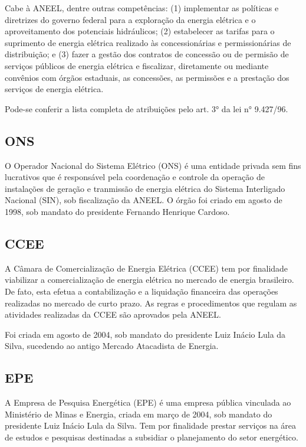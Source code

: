 \documentclass[grad,numbers]{coppe}
\begin{document}
  Cabe à ANEEL, dentre outras competências: (1) implementar as políticas e diretrizes do governo federal para a exploração da energia elétrica e o aproveitamento dos potenciais hidráulicos; (2) estabelecer as tarifas para o suprimento de energia elétrica realizado às concessionárias e permissionárias de distribuição; e (3) fazer a gestão dos contratos de concessão ou de permisão de serviços públicos de energia elétrica e fiscalizar, diretamente ou mediante convênios com órgãos estaduais, as concessões, as permissões e a prestação dos serviços de energia elétrica.
  
  Pode-se conferir a lista completa de atribuições pelo art. 3° da lei n°
  9.427/96.
  
  \hypertarget{ons}{%
  \subsection{ONS}\label{ons}}
  
  O Operador Nacional do Sistema Elétrico (ONS) é uma entidade privada sem fins lucrativos que é responsável pela coordenação e controle da operação de instalações de geração e tranmissão de energia elétrica do Sistema Interligado Nacional (SIN), sob fiscalização da ANEEL. O órgão foi criado em agosto de 1998, sob mandato do presidente Fernando Henrique Cardoso.
  
  \hypertarget{ccee}{%
  \subsection{CCEE}\label{ccee}}
  
  A Câmara de Comercialização de Energia Elétrica (CCEE) tem por finalidade viabilizar a comercialização de energia elétrica no mercado de energia brasileiro. De fato, esta efetua a contabilização e a liquidação financeira das operações realizadas no mercado de curto prazo. As regras e procedimentos que regulam as atividades realizadas da CCEE são aprovados pela ANEEL.
  
  Foi criada em agosto de 2004, sob mandato do presidente Luiz Inácio Lula da Silva, sucedendo ao antigo Mercado Atacadista de Energia.
  
  \hypertarget{epe}{%
  \subsection{EPE}\label{epe}}
  
  A Empresa de Pesquisa Energética (EPE) é uma empresa pública vinculada ao Ministério de Minas e Energia, criada em março de 2004, sob mandato do presidente Luiz Inácio Lula da Silva. Tem por finalidade prestar serviços na área de estudos e pesquisas destinadas a subsidiar o planejamento do setor energético.
  
\end{document}
